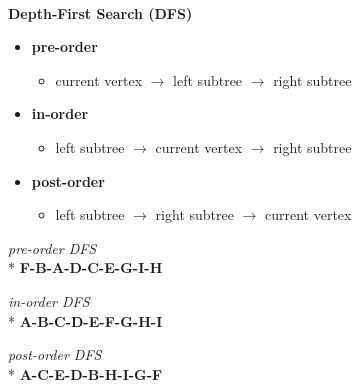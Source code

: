 \documentclass[10pt, landscape]{article}
\let\then\rightarrow
\begin{document}
\begin{multicols}{4}
\ 
\\ \textbf{Depth-First Search (DFS)}
\begin{itemize}
    \item \textbf{pre-order}
    \begin{itemize}
        \item current vertex $\then$ left subtree $\then$ right subtree
    \end{itemize}
    \item \textbf{in-order}
    \begin{itemize}
        \item left subtree $\then$ current vertex $\then$ right subtree
    \end{itemize}
    \item \textbf{post-order}
    \begin{itemize}
        \item left subtree $\then$ right subtree $\then$ current vertex 
    \end{itemize}
\end{itemize}
\begin{center}
    \begin{multicols}{3}
        \textit{pre-order DFS}
        \\* {\tiny\textbf{F-B-A-D-C-E-G-I-H}}
        
        \textit{in-order DFS}
        \\* {\tiny\textbf{A-B-C-D-E-F-G-H-I}}
        
        \textit{post-order DFS}
        \\* {\tiny\textbf{A-C-E-D-B-H-I-G-F}}
    \end{multicols}
\end{center}


\end{multicols}
\end{document}
